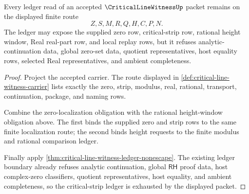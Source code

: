 \begin{theorem}
\label{thm:criticallinewitness-critical-strip-ledger}
Every ledger read of an accepted $\CriticalLineWitnessUp$ packet remains on the displayed finite route
$$
Z,S,M,R,Q,H,C,P,N.
$$
The ledger may expose the supplied zero row, critical-strip row, rational height window, Real real-part row, and local replay rows, but it refuses analytic-continuation data, global zero-set data, quotient representatives, host equality rows, selected Real representatives, and ambient completeness.
\end{theorem}
\begin{proof}
Project the accepted carrier. The route displayed in \autoref{def:critical-line-witness-carrier} lists exactly the zero, strip, modulus, real, rational, transport, continuation, package, and naming rows.

Combine the zero-localization obligation with the rational height-window obligation above. The first binds the supplied zero and strip rows to the same finite localization route; the second binds height requests to the finite modulus and rational comparison ledger.

Finally apply \autoref{thm:critical-line-witness-ledger-nonescape}. The existing ledger boundary already refuses analytic continuation, global $\mathsf{RH}$ proof data, host complex-zero classifiers, quotient representatives, host equality, and ambient completeness, so the critical-strip ledger is exhausted by the displayed packet.
\end{proof}


